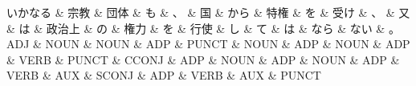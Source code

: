 \documentclass[tikz,border=5pt]{standalone}
\begin{document}
\normalsize
\begin{dependency}[edge unit distance=12.0pt]
    \begin{deptext}[column sep=1em]
        いかなる \& 宗教 \& 団体 \& も \& 、 \& 国 \& から \& 特権 \& を \& 受け \& 、 \& 又 \& は \& 政治上 \& の \& 権力 \& を \& 行使 \& し \& て \& は \& なら \& ない \& 。\\
        ADJ \& NOUN \& NOUN \& ADP \& PUNCT \& NOUN \& ADP \& NOUN \& ADP \& VERB \& PUNCT \& CCONJ \& ADP \& NOUN \& ADP \& NOUN \& ADP \& VERB \& AUX \& SCONJ \& ADP \& VERB \& AUX \& PUNCT\\
    \end{deptext}
\end{dependency}
\end{document}
